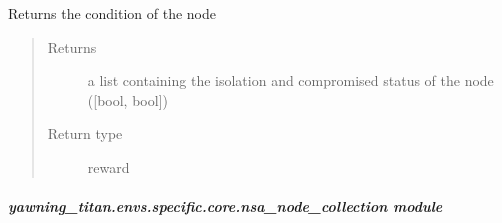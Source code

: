 \documentclass[letterpaper,10pt,english]{sphinxmanual}
\begin{document}
\begin{fulllineitems}
\begin{fulllineitems}
\label{\detokenize{source/yawning_titan.envs.specific.core:yawning_titan.envs.specific.core.nsa_node.Node.get_condition}}
\sphinxAtStartPar
Returns the condition of the node
\begin{quote}\begin{description}
\item[{Returns}] \leavevmode
\sphinxAtStartPar
a list containing the isolation and compromised status of the node ({[}bool, bool{]})

\item[{Return type}] \leavevmode
\sphinxAtStartPar
reward

\end{description}\end{quote}

\end{fulllineitems}


\end{fulllineitems}



\subparagraph{yawning\_titan.envs.specific.core.nsa\_node\_collection module}
\label{\detokenize{source/yawning_titan.envs.specific.core:module-yawning_titan.envs.specific.core.nsa_node_collection}}\label{\detokenize{source/yawning_titan.envs.specific.core:yawning-titan-envs-specific-core-nsa-node-collection-module}}
\end{document}
